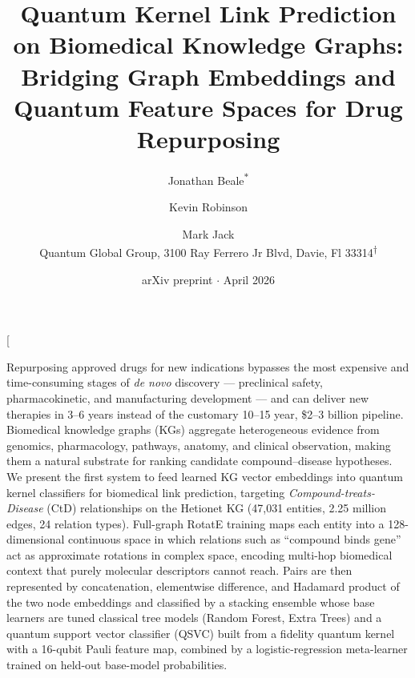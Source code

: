 \documentclass[twocolumn,10pt]{article}
\title{\textbf{Quantum Kernel Link Prediction on Biomedical Knowledge Graphs:}\\
\textbf{Bridging Graph Embeddings and Quantum Feature Spaces for Drug Repurposing}}
\author{%
Jonathan Beale\textsuperscript{\hspace{-0.05em}$\ast$}%
\and Kevin Robinson \and Mark Jack\\
\small Quantum Global Group, 3100 Ray Ferrero Jr Blvd, Davie, Fl 33314\textsuperscript{\hspace{-0.05em}$\dagger$}%
}
\date{arXiv preprint $\cdot$ April 2026}
\begin{document}
\renewcommand{\thefootnote}{\fnsymbol{footnote}}

\twocolumn[
  \maketitle
  \begin{onecolabstract}
Repurposing approved drugs for new indications bypasses the most expensive and time-consuming stages of \textit{de novo} discovery --- preclinical safety, pharmacokinetic, and manufacturing development --- and can deliver new therapies in 3--6 years instead of the customary 10--15 year, \$2--3 billion pipeline. Biomedical knowledge graphs (KGs) aggregate heterogeneous evidence from genomics, pharmacology, pathways, anatomy, and clinical observation, making them a natural substrate for ranking candidate compound--disease hypotheses. We present the first system to feed learned KG vector embeddings into quantum kernel classifiers for biomedical link prediction, targeting \textit{Compound-treats-Disease} (CtD) relationships on the Hetionet KG (47{,}031 entities, 2.25 million edges, 24 relation types). Full-graph RotatE training maps each entity into a 128-dimensional continuous space in which relations such as ``compound binds gene'' act as approximate rotations in complex space, encoding multi-hop biomedical context that purely molecular descriptors cannot reach. Pairs are then represented by concatenation, elementwise difference, and Hadamard product of the two node embeddings and classified by a stacking ensemble whose base learners are tuned classical tree models (Random Forest, Extra Trees) and a quantum support vector classifier (QSVC) built from a fidelity quantum kernel with a 16-qubit Pauli feature map, combined by a logistic-regression meta-learner trained on held-out base-model probabilities.


\end{onecolabstract}
\end{document}
